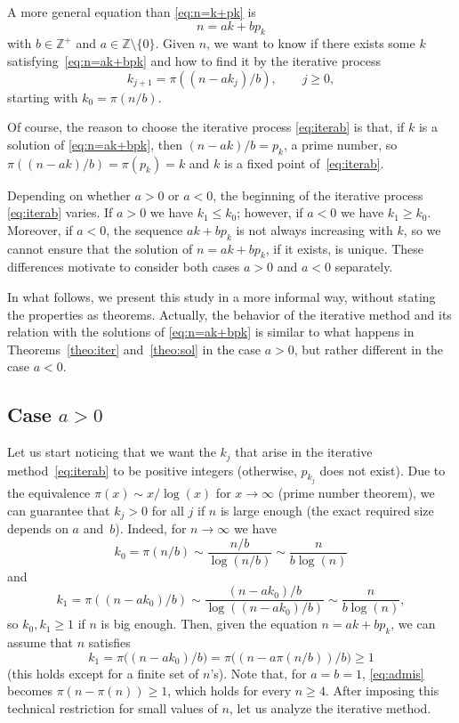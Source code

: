 \documentclass[12pt,reqno]{article}
\begin{document}
A more general equation than \eqref{eq:n=k+pk} is
\begin{equation}
\label{eq:n=ak+bpk}
  n = a k + b p_k
\end{equation}
with $b \in \mathbb{Z}^{+}$ and $a \in \mathbb{Z} \setminus\{0\}$.
Given $n$, we want to know if there exists some $k$ satisfying~\eqref{eq:n=ak+bpk}
and how to find it by the iterative process 
\begin{equation}
\label{eq:iterab}
  k_{j+1} = \pi((n-ak_j)/b), 
  \qquad j \ge 0,
\end{equation}
starting with $k_0 = \pi(n/b)$.

Of course, the reason to choose the iterative process \eqref{eq:iterab} is that,
if $k$ is a solution of \eqref{eq:n=ak+bpk}, then $(n-ak)/b = p_k$, a prime number,
so $\pi((n-ak)/b) = \pi(p_k) = k$ and $k$ is a fixed point of~\eqref{eq:iterab}.

Depending on whether $a>0$ or $a<0$, the beginning of the iterative process \eqref{eq:iterab} varies. 
If $a>0$ we have $k_1 \le k_0$; however, if $a<0$ we have $k_1 \ge k_0$. 
Moreover, if $a<0$, the sequence $ak+bp_k$ is not always increasing with $k$, so we cannot ensure that the solution of $n = ak+bp_k$, if it exists, is unique. These differences motivate to consider both cases $a>0$ and $a<0$ separately.

In what follows, we present this study in a more informal way, without stating the properties as theorems. Actually, the behavior of the iterative method and its relation with the solutions of \eqref{eq:n=ak+bpk} is similar to what happens in Theorems~\ref{theo:iter} and~\ref{theo:sol} in the case $a>0$, but rather different in the case $a<0$.

\subsection{Case $a>0$}
\label{sec:gena>0}

Let us start noticing that we want the $k_j$ that arise in the iterative method~\eqref{eq:iterab} to be positive integers (otherwise, $p_{k_j}$ does not exist). 
Due to the equivalence $\pi(x) \sim x/\log(x)$ for $x\to\infty$ (prime number theorem),
we can guarantee that $k_j > 0$ for all $j$ if $n$ is large enough
(the exact required size depends on $a$ and~$b$). Indeed, for $n\to\infty$ we have
\[
  k_0 = \pi(n/b) \sim \frac{n/b}{\log(n/b)} \sim \frac{n}{b\log(n)}
\]
and
\[
  k_1 = \pi((n-ak_0)/b) \sim \frac{(n-ak_0)/b}{\log((n-ak_0)/b)} 
  \sim \frac{n}{b\log(n)},
\]
so $k_0, k_1 \ge 1$ if $n$ is big enough. 
Then, given the equation $n = a k + b p_k$, we can assume that $n$ satisfies 
\begin{equation}
\label{eq:admis}
  k_1 = \pi\big((n-ak_0)/b\big) = \pi\big((n-a\pi(n/b))/b\big)  \ge 1
\end{equation}
(this holds except for a finite set of $n$'s). Note that, for $a=b=1$, \eqref{eq:admis} becomes $\pi(n-\pi(n)) \ge 1$, which holds for every $n \ge 4$.
After imposing this technical restriction for small values of $n$, let us analyze the iterative method.
\end{document}
